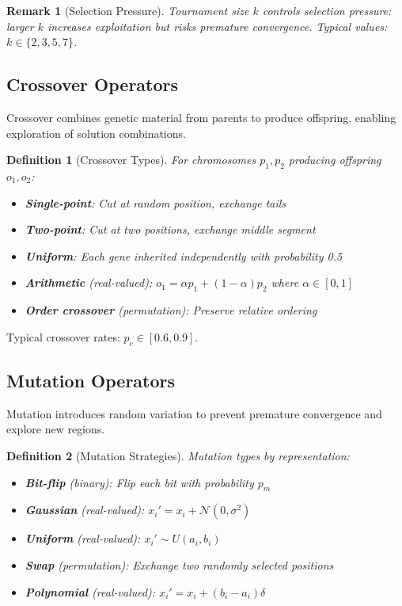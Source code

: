 \documentclass[a4paper, 11pt]{article}
\newtheorem{definition}{Definition}[section]
\newtheorem{remark}{Remark}[section]
\begin{document}
\begin{remark}[Selection Pressure]
Tournament size $k$ controls selection pressure: larger $k$ increases exploitation but risks premature convergence. Typical values: $k \in \{2, 3, 5, 7\}$.
\end{remark}

\subsection{Crossover Operators}

Crossover combines genetic material from parents to produce offspring, enabling exploration of solution combinations.

\begin{definition}[Crossover Types]
For chromosomes $p_1, p_2$ producing offspring $o_1, o_2$:
\begin{itemize}
\item \textbf{Single-point}: Cut at random position, exchange tails
\item \textbf{Two-point}: Cut at two positions, exchange middle segment
\item \textbf{Uniform}: Each gene inherited independently with probability 0.5
\item \textbf{Arithmetic} (real-valued): $o_1 = \alpha p_1 + (1-\alpha) p_2$ where $\alpha \in [0,1]$
\item \textbf{Order crossover} (permutation): Preserve relative ordering
\end{itemize}
\end{definition}

Typical crossover rates: $p_c \in [0.6, 0.9]$.

\subsection{Mutation Operators}

Mutation introduces random variation to prevent premature convergence and explore new regions.

\begin{definition}[Mutation Strategies]
Mutation types by representation:
\begin{itemize}
\item \textbf{Bit-flip} (binary): Flip each bit with probability $p_m$
\item \textbf{Gaussian} (real-valued): $x_i' = x_i + \mathcal{N}(0, \sigma^2)$
\item \textbf{Uniform} (real-valued): $x_i' \sim U(a_i, b_i)$
\item \textbf{Swap} (permutation): Exchange two randomly selected positions
\item \textbf{Polynomial} (real-valued): $x_i' = x_i + (b_i - a_i) \delta$
\end{itemize}
\end{definition}
\end{document}
